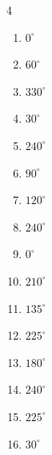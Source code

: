 \begin{multicols}{4}
\begin{enumerate}
  \item $\displaystyle 0^{\circ}$
        \phantom{$\displaystyle =0$}

  \item $\displaystyle 60^{\circ}$

  \item $\displaystyle 330^{\circ}$

  \item $\displaystyle 30^{\circ}$

  \item $\displaystyle 240^{\circ}$

  \item $\displaystyle 90^{\circ}$

  \item $\displaystyle 120^{\circ}$

  \item $\displaystyle 240^{\circ}$

  \item $\displaystyle 0^{\circ}$
        \phantom{$\displaystyle =0$}

  \item $\displaystyle 210^{\circ}$

  \item $\displaystyle 135^{\circ}$

  \item $\displaystyle 225^{\circ}$

  \item $\displaystyle 180^{\circ}$
        \phantom{$\displaystyle =\pi$}

  \item $\displaystyle 240^{\circ}$

\columnbreak %

  \item $\displaystyle 225^{\circ}$

  \item $\displaystyle 30^{\circ}$


\end{enumerate}
\end{multicols}
